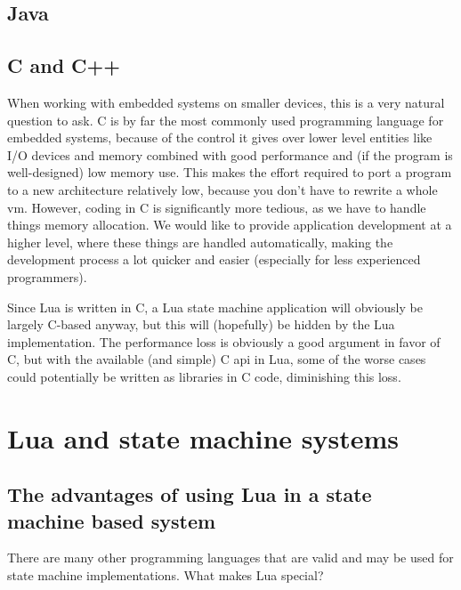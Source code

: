 \subsection{Java}
\label{sec:lua_vs_java}


\subsection{C and C++}
\label{sec:lua_vs_c}
When working with embedded systems on smaller devices, this is a very natural question to ask. C is by far the most commonly used programming language for embedded systems, because of the control it gives over lower level entities like I/O devices and memory combined with good performance and (if the program is well-designed) low memory use. This makes the effort required to port a program to a new architecture relatively low, because you don't have to rewrite a whole \gls{vm}. However, coding in C is significantly more tedious, as we have to handle things memory allocation. We would like to provide application development at a \guillemotleft higher level\guillemotright, where these things are handled automatically, making the development process a lot quicker and easier (especially for less experienced programmers).

Since Lua is written in C, a Lua state machine application will obviously be largely C-based anyway, but this will (hopefully) be hidden by the Lua implementation. The performance loss is obviously a good argument in favor of C, but with the available (and simple) C \gls{api} in Lua, some of the worse cases could potentially be written as libraries in C code, diminishing this loss.

\section{Lua and state machine systems}
\label{sec:lua_and_state_machines}

\subsection{The advantages of using Lua in a state machine based system}
\label{sec:lua_advantages}

There are many other programming languages that are valid and may be used for state machine implementations. What makes Lua special?

